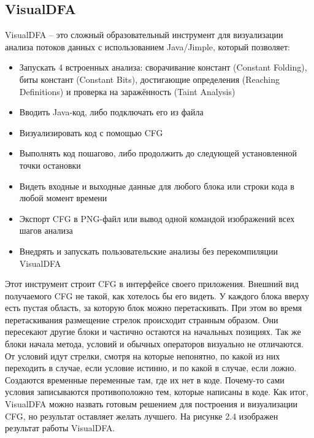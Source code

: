 \subsection{VisualDFA} \label{ch2:subsec-title-abbr}
VisualDFA – это сложный образовательный инструмент для визуализации анализа потоков данных с использованием Java/Jimple, который позволяет:
\begin{itemize}
\item Запускать 4 встроенных анализа: сворачивание констант (Constant Folding), биты констант (Constant Bits), достигающие определения (Reaching Definitions) и проверка на заражённость (Taint Analysis)
\item Вводить Java-код, либо подключать его из файла
\item Визуализировать код с помощью CFG
\item Выполнять код пошагово, либо продолжить до следующей установленной точки остановки
\item Видеть входные и выходные данные для любого блока или строки кода в любой момент времени
\item Экспорт CFG в PNG-файл или вывод одной командой изображений всех шагов анализа
\item Внедрять и запускать пользовательские анализы без перекомпиляции VisualDFA
\end{itemize}
Этот инструмент строит CFG в интерфейсе своего приложения. Внешний вид получаемого CFG не такой, как хотелось бы его видеть. У каждого блока вверху есть пустая область, за которую блок можно перетаскивать. При этом во время перетаскивания размещение стрелок происходит странным образом. Они пересекают другие блоки и частично остаются на начальных позициях. Так же блоки начала метода, условий и обычных операторов визуально не отличаются. От условий идут стрелки, смотря на которые непонятно, по какой из них переходить в случае, если условие истинно, и по какой в случае, если ложно. Создаются временные переменные там, где их нет в коде. Почему-то сами условия записываются противоположно тем, которые написаны в коде.
Как итог, VisualDFA можно назвать готовым решением для построения и визуализации CFG, но результат оставляет желать лучшего. На рисунке 2.4 изображен результат работы VisualDFA.\\
